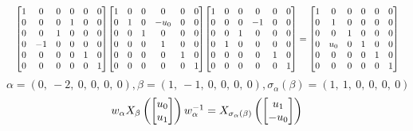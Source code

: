 \documentclass[11pt]{article}
\theoremstyle{definition}
\begin{document}
\[
\scaletoalign{\textwidth}{{\left[\begin{matrix}1 & 0 & 0 & 0 & 0 & 0\\0 & 0 & 0 & 1 & 0 & 0\\0 & 0 & 1 & 0 & 0 & 0\\0 & -1 & 0 & 0 & 0 & 0\\0 & 0 & 0 & 0 & 1 & 0\\0 & 0 & 0 & 0 & 0 & 1\end{matrix}\right]} {\left[\begin{matrix}1 & 0 & 0 & 0 & 0 & 0\\0 & 1 & 0 & - u_{0} & 0 & 0\\0 & 0 & 1 & 0 & 0 & 0\\0 & 0 & 0 & 1 & 0 & 0\\0 & 0 & 0 & 0 & 1 & 0\\0 & 0 & 0 & 0 & 0 & 1\end{matrix}\right]} {\left[\begin{matrix}1 & 0 & 0 & 0 & 0 & 0\\0 & 0 & 0 & -1 & 0 & 0\\0 & 0 & 1 & 0 & 0 & 0\\0 & 1 & 0 & 0 & 0 & 0\\0 & 0 & 0 & 0 & 1 & 0\\0 & 0 & 0 & 0 & 0 & 1\end{matrix}\right]} = {\left[\begin{matrix}1 & 0 & 0 & 0 & 0 & 0\\0 & 1 & 0 & 0 & 0 & 0\\0 & 0 & 1 & 0 & 0 & 0\\0 & u_{0} & 0 & 1 & 0 & 0\\0 & 0 & 0 & 0 & 1 & 0\\0 & 0 & 0 & 0 & 0 & 1\end{matrix}\right]}}
\]
\[
\alpha = \left( 0, \  -2, \  0, \  0, \  0, \  0\right), \beta = \left( 1, \  -1, \  0, \  0, \  0, \  0\right), \sigma_{\alpha}(\beta) = \left( 1, \  1, \  0, \  0, \  0, \  0\right)
\]
\[
\scaletoalign{\textwidth}{w_{\alpha} X_{\beta}\left(\left[\begin{matrix}u_{0}\\u_{1}\end{matrix}\right]\right) w_{\alpha}^{-1} = X_{\sigma_{\alpha}\left(\beta\right)}\left(\left[\begin{matrix}u_{1}\\- u_{0}\end{matrix}\right]\right)}
\]
\end{document}
